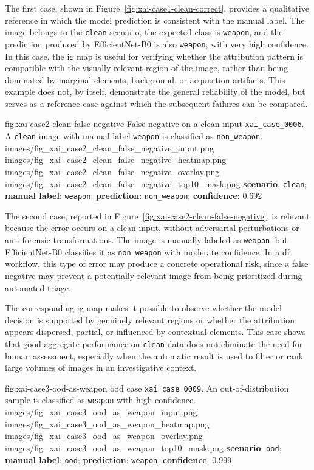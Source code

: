 The first case, shown in Figure~\ref{fig:xai-case1-clean-correct}, provides a
qualitative reference in which the model prediction is consistent with the
manual label. The image belongs to the \texttt{clean} scenario, the expected
class is \texttt{weapon}, and the prediction produced by EfficientNet-B0 is also
\texttt{weapon}, with very high confidence. In this case, the \gls{ig} map is
useful for verifying whether the attribution pattern is compatible with the
visually relevant region of the image, rather than being dominated by marginal
elements, background, or acquisition artifacts. This example does not, by
itself, demonstrate the general reliability of the model, but serves as a
reference case against which the subsequent failures can be compared.

\XAIcaseFigureMaskGrid
{fig:xai-case2-clean-false-negative}
{False negative on a clean input \texttt{xai\_case\_0006}. A \texttt{clean}
image with manual label \texttt{weapon} is classified as
\texttt{non\_weapon}.}
{images/fig_xai_case2_clean_false_negative_input.png}
{images/fig_xai_case2_clean_false_negative_heatmap.png}
{images/fig_xai_case2_clean_false_negative_overlay.png}
{images/fig_xai_case2_clean_false_negative_top10_mask.png}
{\textbf{scenario}: \texttt{clean};
\textbf{manual label}: \texttt{weapon};
\textbf{prediction}: \texttt{non\_weapon};
\textbf{confidence}: 0.692}

The second case, reported in
Figure~\ref{fig:xai-case2-clean-false-negative}, is relevant because the error
occurs on a clean input, without adversarial perturbations or anti-forensic
transformations. The image is manually labeled as \texttt{weapon}, but
EfficientNet-B0 classifies it as \texttt{non\_weapon} with moderate confidence.
In a \gls{df} workflow, this type of error may produce a concrete operational
risk, since a false negative may prevent a potentially relevant image from being
prioritized during automated triage.

The corresponding \gls{ig} map makes it possible to observe whether the model
decision is supported by genuinely relevant regions or whether the attribution
appears dispersed, partial, or influenced by contextual elements. This case
shows that good aggregate performance on \texttt{clean} data does not eliminate
the need for human assessment, especially when the automatic result is used to
filter or rank large volumes of images in an investigative context.

\XAIcaseFigureMaskGrid
{fig:xai-case3-ood-as-weapon}
{\gls{ood} case \texttt{xai\_case\_0009}. An out-of-distribution sample is
classified as \texttt{weapon} with high confidence.}
{images/fig_xai_case3_ood_as_weapon_input.png}
{images/fig_xai_case3_ood_as_weapon_heatmap.png}
{images/fig_xai_case3_ood_as_weapon_overlay.png}
{images/fig_xai_case3_ood_as_weapon_top10_mask.png}
{\textbf{scenario}: \texttt{ood};
\textbf{manual label}: \texttt{ood};
\textbf{prediction}: \texttt{weapon};
\textbf{confidence}: 0.999}

